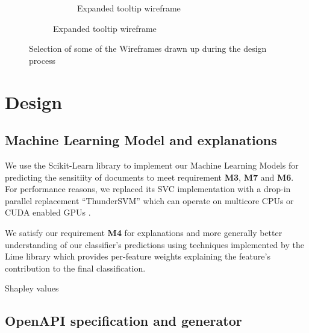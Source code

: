 \documentclass[\version]{l4proj}
\begin{document}
\begin{figure}[H]
\begin{subfigure}[b]{\linewidth}
\begin{subfigure}[b]{0.4\linewidth}
            \caption{Expanded tooltip wireframe}\label{fig:expanded-tooltip-wireframe}
        \end{subfigure}
    \end{subfigure}
    \caption{Selection of some of the Wireframes drawn up during the design process}\label{fig:wireframes}

\end{figure}


\chapter{Design}



\section{Machine Learning Model and explanations}


We use the Scikit-Learn library to implement our Machine Learning Models \autocite{pedregosaScikitlearnMachineLearning2011} for predicting the sensitiity of documents to meet requirement \textbf{M3}, \textbf{M7} and \textbf{M6}. For performance reasons, we replaced its SVC implementation with a drop-in parallel replacement ``ThunderSVM'' which can operate on multicore CPUs or CUDA enabled GPUs \autocite{wenThunderSVMFastSVM2018}.

We satisfy our requirement \textbf{M4} for explanations and more generally better understanding of our classifier's predictions using techniques implemented by the Lime library \autocite{ribeiroWhyShouldTrust2016} which provides per-feature weights explaining the feature's contribution to the final classification.

\autocite{lundbergUnifiedApproachInterpreting2017} Shapley values


\section{OpenAPI specification and generator}
\end{document}
